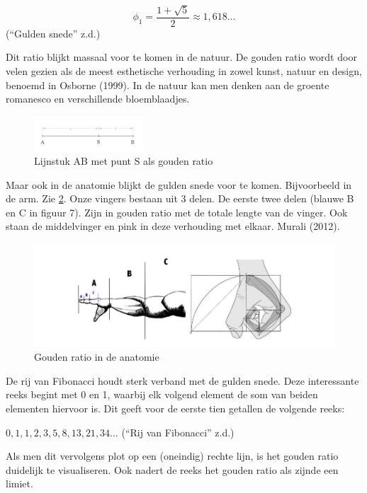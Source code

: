 \[ \phi_{1} = \frac{1+\sqrt{5}}{2} \approx 1,618\dots \] (``Gulden
snede'' z.d.)

Dit ratio blijkt massaal voor te komen in de natuur. De gouden ratio
wordt door velen gezien als de meest esthetische verhouding in zowel
kunst, natuur en design, benoemd in Osborne (1999). In de natuur kan men
denken aan de groente romanesco en verschillende bloemblaadjes.

\begin{figure}
\centering
\includegraphics[width=0.36\textwidth,height=\textheight]{img/image_7.png}
\caption{Lijnstuk AB met punt S als gouden ratio\label{fig:lijn}}
\end{figure}

Maar ook in de anatomie blijkt de gulden snede voor te komen.
Bijvoorbeeld in de arm. Zie \cref{fig:goudenanatomie}.
Onze vingers bestaan uit 3 delen. De eerste twee delen (blauwe B en C in
figuur 7). Zijn in gouden ratio met de totale lengte van de vinger. Ook
staan de middelvinger en pink in deze verhouding met elkaar. Murali
(2012).

\begin{figure}
\centering
\includegraphics[width=1\textwidth,height=\textheight]{img/goudenanatomie.png}
\caption{Gouden ratio in de anatomie\label{fig:goudenanatomie}}
\end{figure}

De rij van Fibonacci houdt sterk verband met de gulden snede. Deze
interessante reeks begint met 0 en 1, waarbij elk volgend element de som
van beiden elementen hiervoor is. Dit geeft voor de eerste tien getallen
de volgende reeks:

\(0, 1, 1, 2, 3, 5, 8, 13, 21, 34 \dots\) (``Rij van Fibonacci'' z.d.)

Als men dit vervolgens plot op een (oneindig) rechte lijn, is het gouden
ratio duidelijk te visualiseren. Ook nadert de reeks het gouden ratio
als zijnde een limiet.
